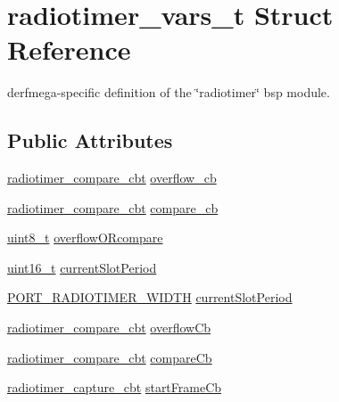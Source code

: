 \hypertarget{structradiotimer__vars__t}{}\section{radiotimer\+\_\+vars\+\_\+t Struct Reference}
\label{structradiotimer__vars__t}


derfmega-\/specific definition of the \char`\"{}radiotimer\char`\"{} bsp module.  


\subsection*{Public Attributes}
\begin{DoxyCompactItemize}
\item 
\hyperlink{group__radiotimer_ga62b602325e65023c91b784f20cd2d6bc}{radiotimer\+\_\+compare\+\_\+cbt} \hyperlink{structradiotimer__vars__t_a660c7dbca1719cd868b78cfa4e7bd54d}{overflow\+\_\+cb}
\item 
\hyperlink{group__radiotimer_ga62b602325e65023c91b784f20cd2d6bc}{radiotimer\+\_\+compare\+\_\+cbt} \hyperlink{structradiotimer__vars__t_a2aa018ea64804baa337d825420f2f7d6}{compare\+\_\+cb}
\item 
\hyperlink{_p_e___types_8h_aba7bc1797add20fe3efdf37ced1182c5}{uint8\+\_\+t} \hyperlink{structradiotimer__vars__t_a101d4ae629d79ffa06f34946194a0316}{overflow\+O\+Rcompare}
\item 
\hyperlink{_p_e___types_8h_a1f1825b69244eb3ad2c7165ddc99c956}{uint16\+\_\+t} \hyperlink{structradiotimer__vars__t_a68270092a6680f89363231ec8d89867e}{current\+Slot\+Period}
\item 
\hyperlink{z1_2board__info_8h_ac16e02aadd749b2d27638bed1a805a59}{P\+O\+R\+T\+\_\+\+R\+A\+D\+I\+O\+T\+I\+M\+E\+R\+\_\+\+W\+I\+D\+TH} \hyperlink{structradiotimer__vars__t_a4c8bd90873d8abaa7275b110192a497c}{current\+Slot\+Period}
\item 
\hyperlink{group__radiotimer_ga62b602325e65023c91b784f20cd2d6bc}{radiotimer\+\_\+compare\+\_\+cbt} \hyperlink{structradiotimer__vars__t_a0ee5a190b5b75d3bb1fb7308aa52e78d}{overflow\+Cb}
\item 
\hyperlink{group__radiotimer_ga62b602325e65023c91b784f20cd2d6bc}{radiotimer\+\_\+compare\+\_\+cbt} \hyperlink{structradiotimer__vars__t_a7acaf4a34fe5cdb1411d3ff5fd07023c}{compare\+Cb}
\item 
\hyperlink{group__radiotimer_gac7da641d0774aa21bfabefd560e42acf}{radiotimer\+\_\+capture\+\_\+cbt} \hyperlink{structradiotimer__vars__t_a384be2c7f4649422003808180242d0a8}{start\+Frame\+Cb}

\end{DoxyCompactItemize}
